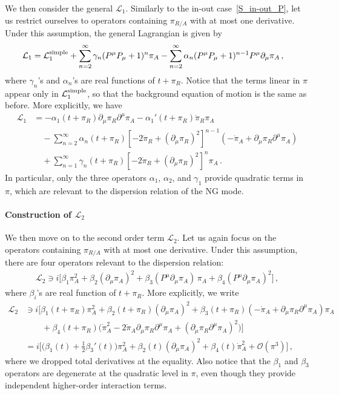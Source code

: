 \documentclass[a4paper,11pt]{article}
\begin{document}
We then consider the general $\mathcal{L}_1$. 
Similarly to the in-out case~\eqref{S_in-out_P}, 
let us restrict ourselves to operators containing $\pi_{R/A}$
with at most one derivative. Under this assumption, the general Lagrangian is given by
\begin{align}
\mathcal{L}_1&=
\mathcal{L}_1^{\rm simple}+\sum_{n=2}^\infty\gamma_n(P^\mu P_\mu+1)^n\pi_A
-\sum_{n=2}^\infty\alpha_n(P^\mu P_\mu+1)^{n-1}P^\mu\partial_\mu\pi_A\,,
\end{align}
where $\gamma_n$'s and $\alpha_n$'s are real functions of $t+\pi_R$. Notice that the terms linear in $\pi$ appear only in $\mathcal{L}_1^{\rm simple}$, so that the background equation of motion is the same as before. More explicitly, we have
\begin{align}
\nonumber
\mathcal{L}_1&=
-\alpha_1(t+\pi_R)\partial_\mu\pi_R\partial^\mu\pi_A
-\alpha_1'(t+\pi_R)\dot{\pi}_R\pi_A
\\
\nonumber
&\quad
-\sum_{n=2}^\infty\alpha_n(t+\pi_R)\left[-2\dot{\pi}_R+(\partial_\mu\pi_R)^2\right]^{n-1}(-\dot{\pi}_A+\partial_\mu\pi_R\partial^\mu\pi_A)
\\
&\quad
+\sum_{n=1}^\infty\gamma_n(t+\pi_R)\left[-2\dot{\pi}_R+(\partial_\mu\pi_R)^2\right]^n\pi_A\,.
\label{EFTLag:pi_A1}
\end{align}
In particular, only the three operators $\alpha_1$, $\alpha_2$, and $\gamma_1$ provide quadratic terms in $\pi$, which are relevant to the dispersion relation
of the NG mode. 


\paragraph{Construction of $\mathcal{L}_2$}

We then move on to the second order term $\mathcal{L}_2$. 
Let us again focus on the operators containing $\pi_{R/A}$ with 
at most one derivative. 
Under this assumption, there are four operators relevant to the dispersion relation:
\begin{align}
\label{L2_simple_P}
\mathcal{L}_2\ni i\Big[
\beta_1\pi_A^2+\beta_2(\partial_\mu\pi_A)^2
+\beta_3(P^\mu\partial_\mu\pi_A)\,\pi_A
+\beta_4(P^\mu\partial_\mu\pi_A)^2
\Big]\,,
\end{align}
where $\beta_i$'s are real function of $t+\pi_R$.
More explicitly, we write 
\begin{align}
\nonumber
\mathcal{L}_2&\ni i\Big[
\beta_1(t+\pi_R)\pi_A^2+\beta_2(t+\pi_R)(\partial_\mu\pi_A)^2
+\beta_3(t+\pi_R)(-\dot{\pi}_A+\partial_\mu\pi_R\partial^\mu\pi_A)\pi_A
\\
\nonumber
&\qquad
+\beta_4(t+\pi_R)\big(\dot{\pi}_A^2-2\dot{\pi}_A\partial_\mu\pi_R\partial^\mu\pi_A
+(\partial_\mu\pi_R\partial^\mu\pi_A)^2\big)
\Big]
\\
\label{L2_simple}
&= i\Big[
\big(\beta_1(t) + \tfrac{1}{2}\beta_3'(t)\big)\pi_A^2+\beta_2(t)(\partial_\mu\pi_A)^2
+\beta_4(t)\dot{\pi}_A^2
+\mathcal{O}(\pi^3)\Big]
\,,
\end{align}
where we dropped total derivatives at the equality. 
Also notice that the $\beta_1$ and $\beta_3$ operators are degenerate at the quadratic level in $\pi$, even though they provide independent higher-order interaction terms.
\end{document}
